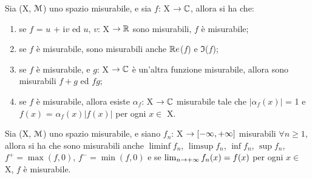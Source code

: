 \documentclass[Completo.tex]{subfiles}
\begin{document}
\begin{Prop}
	Sia (X, $\eu[M]$) uno spazio misurabile, e sia $f$: X $\ra \bb[C]$, allora si ha che:
	\begin{enumerate}
		\item se $f$ = $u$ + i$v$ ed $u$, $v$: X $\ra \bb[R]$ sono misurabili, $f$ è misurabile;
		\item se $f$ è misurabile, sono misurabili anche $\bb[R]e$($f$) e $\Im$($f$);
		\item se $f$ è misurabile, e $g$: X $\ra \bb[C]$ è un'altra funzione misurabile, allora sono misurabili $f+g$ ed $fg$;
		\item se $f$ è misurabile, allora esiste $\alpha_f$: X $\ra \bb[C]$ misurabile tale che $\vert \alpha_f(x) \vert$ = 1 e $f(x)$ = $\alpha_f(x) \vert f(x) \vert$ per ogni $x \in$ X.
	\end{enumerate}
\end{Prop}
\begin{Prop}
	Sia (X, $\eu[M]$) uno spazio misurabile, e siano $f_n$: X $\rightarrow [-\infty, +\infty]$ misurabili $\forall n \geq 1$, allora si ha che sono misurabili anche $\liminf f_n$, $\limsup f_n$, $\inf f_n$, $\sup f_n$, $f^{+} = \max(f, 0)$, $f^{-} = \min(f, 0)$ e se $\lim_{n \rightarrow +\infty} f_n(x) = f(x)$ per ogni $x \in$ X, $f$ è misurabile.
\end{Prop}
\end{document}
